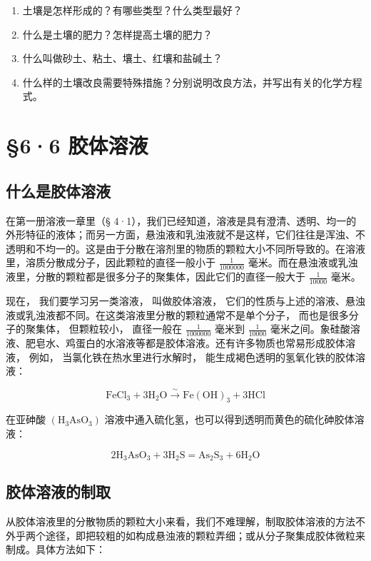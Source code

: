 \begin{enumerate}
\item
  土壤是怎样形成的？有哪些类型？什么类型最好？
\item
  什么是土壤的肥力？怎样提高土壤的肥力？
\item
  什么叫做砂土、粘土、壤土、红壤和盐碱土？
\item
  什么样的土壤改良需要特殊措施？分别说明改良方法，并写出有关的化学方程式。
\end{enumerate}

\section{§6·6 胶体溶液}

\subsection{什么是胶体溶液}

在第一册溶液一章里（§
4·1），我们已经知道，溶液是具有澄清、透明、均一的外形特征的液体；而另一方面，悬浊液和乳浊液就不是这样，它们往往是浑浊、不透明和不均一的。这是由于分散在溶剂里的物质的颗粒大小不同所导致的。在溶液里，溶质分散成分子，因此颗粒的直径一般小于
\(\frac{1}{1000000}\)
毫米。而在悬浊液或乳浊液里，分散的颗粒都是很多分子的聚集体，因此它们的直径一般大于
\(\frac{1}{10000}\) 毫米。

现在， 我们要学习另一类溶液， 叫做胶体溶液，
它们的性质与上述的溶液、悬浊液或乳浊液都不同。在这类溶液里分散的颗粒通常不是单个分子，
而也是很多分子的聚集体， 但颗粒较小， 直径一般在 \(\frac{1}{1000000}\)
毫米到 \(\frac{1}{10000}\)
毫米之间。象硅酸溶液、肥皂水、鸡蛋白的水溶液等都是胶体溶液。还有许多物质也常易形成胶体溶液，
例如， 当氯化铁在热水里进行水解时， 能生成褐色透明的氢氧化铁的胶体溶液：

\[
\mathrm{FeCl} _ {3} + 3 \mathrm{H} _ {2} \mathrm{O} \xrightarrow {\sim} \mathrm{Fe(OH)} _ {3} + 3 \mathrm{HCl}
\]

在亚砷酸 \(\left(\mathrm{H}_{3}\mathrm{AsO}_{3}\right)\)
溶液中通入硫化氢，也可以得到透明而黄色的硫化砷胶体溶液：

\[
2 \mathrm{H} _ {3} \mathrm{AsO} _ {3} + 3 \mathrm{H} _ {2} \mathrm{S} = \mathrm{As} _ {2} \mathrm{S} _ {3} + 6 \mathrm{H} _ {2} \mathrm{O}
\]

\subsection{胶体溶液的制取}

从胶体溶液里的分散物质的颗粒大小来看，我们不难理解，制取胶体溶液的方法不外乎两个途径，即把较粗的如构成悬浊液的颗粒弄细；或从分子聚集成胶体微粒来制成。具体方法如下：

